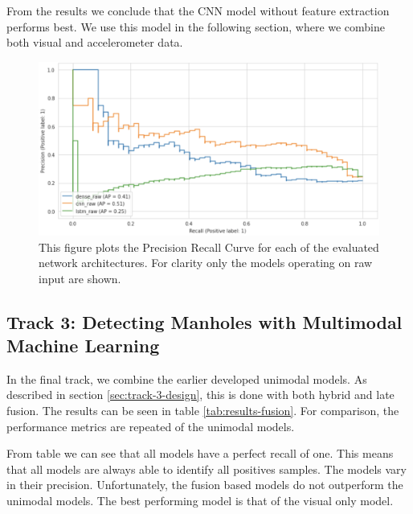 From the results we conclude that the CNN model without feature extraction performs best. We use this model in the following section, where we combine both visual and accelerometer data.

\begin{figure}[ht]
\begin{center}
\includegraphics[width=.75\textwidth,keepaspectratio]{images/6_results/acc-prc.png}
\end{center}
\captionsetup{width=.90\textwidth}
\caption{This figure plots the Precision Recall Curve for each of the evaluated network architectures. For clarity only the models operating on raw input are shown.}
\label{fig:results-acc}
\end{figure}


\subsection{Track 3: Detecting Manholes with Multimodal Machine Learning}

In the final track, we combine the earlier developed unimodal models. As described in section \ref{sec:track-3-design}, this is done with both hybrid and late fusion. The results can be seen in table \ref{tab:results-fusion}. For comparison, the performance metrics are repeated of the unimodal models.

From table we can see that all models have a perfect recall of one. This means that all models are always able to identify all positives samples. The models vary in their precision. Unfortunately, the fusion based models do not outperform the unimodal models. The best performing model is that of the visual only model. 


